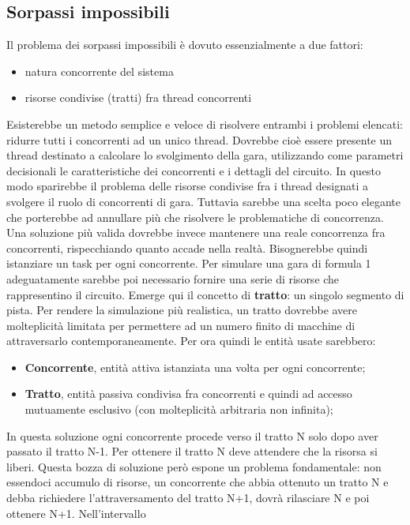 \subsection{Sorpassi impossibili}
\label{sorpassi_impossibili_soluzioni}
Il problema dei sorpassi impossibili è dovuto essenzialmente a due fattori:
\begin{itemize}
\item natura concorrente del sistema
\item risorse condivise (tratti) fra thread concorrenti
\end{itemize}
Esisterebbe un metodo semplice e veloce di risolvere entrambi i problemi elencati: ridurre tutti i concorrenti ad un unico thread.
Dovrebbe cioè essere presente un thread destinato a calcolare lo svolgimento della gara, utilizzando come  parametri decisionali
le caratteristiche dei concorrenti e i dettagli del circuito. In questo modo sparirebbe il problema delle risorse condivise fra
i thread designati a svolgere il ruolo di concorrenti di gara. Tuttavia sarebbe una scelta poco elegante che porterebbe
ad annullare più che risolvere le problematiche di concorrenza.\\
Una soluzione più valida dovrebbe invece mantenere una reale concorrenza fra concorrenti, rispecchiando quanto accade nella realtà.
Bisognerebbe quindi istanziare un task per ogni concorrente. Per simulare una gara di formula 1 adeguatamente sarebbe poi necessario
fornire una serie di risorse che rappresentino il circuito. Emerge qui il concetto di \textbf{tratto}: un singolo segmento di pista.
Per rendere la simulazione più realistica, un tratto dovrebbe avere molteplicità limitata per permettere ad un numero finito di macchine
di attraversarlo contemporaneamente. Per ora quindi le entità usate sarebbero:
\begin{itemize}
\item \textbf{Concorrente}, entità attiva istanziata una volta per ogni concorrente;
\item \textbf{Tratto}, entità passiva condivisa fra concorrenti e quindi ad accesso mutuamente esclusivo (con molteplicità arbitraria non infinita);
\end{itemize}
In questa soluzione ogni concorrente procede verso il tratto N solo dopo aver passato il tratto N-1. Per ottenere il tratto N deve attendere
che la risorsa si liberi. Questa bozza di soluzione però espone un problema fondamentale: non essendoci accumulo di risorse,
un concorrente che abbia ottenuto un tratto N e debba richiedere l'attraversamento del tratto N+1, dovrà rilasciare N e poi ottenere N+1. Nell'intervallo
